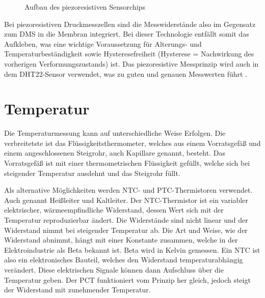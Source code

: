 \begin{figure}[H]
    \caption{Aufbau des piezoresistiven Sensorchips}
    \label{fig:PIEZO}
\end{figure}

Bei piezoresistiven Druckmesszellen sind die Messwiderstände also im Gegensatz zum DMS in die Membran integriert. Bei dieser Technologie entfällt somit das Aufkleben, was eine wichtige Voraussetzung für Alterungs- und Temperaturbeständigkeit sowie Hysteresefreiheit (Hysterese = Nachwirkung des vorherigen Verformungszustands) ist. Das piezoresistive Messprinzip wird auch in dem DHT22-Sensor verwendet, was zu guten und genauen Messwerten führt \cite{Keller:2019}.

\section{Temperatur}

Die Temperaturmessung kann auf unterschiedliche Weise Erfolgen. Die verbreitetste ist das Flüssigkeitsthermometer, welches aus einem Vorratsgefäß und einem angeschlossenen Steigrohr, auch Kapillare genannt, besteht. Das Vorratsgefäß ist mit einer thermometrischen Flüssigkeit gefüllt, welche sich bei steigender Temperatur ausdehnt und das Steigrohr füllt.

Als alternative Möglichkeiten werden NTC- und PTC-Thermistoren verwendet. Auch genannt Heißleiter und Kaltleiter. Der NTC-Thermistor ist ein variabler elektrischer, wärmeempfindliche Widerstand, dessen Wert sich mit der Temperatur reproduzierbar ändert. Die Widerstände sind nicht linear und der Widerstand nimmt bei steigender Temperatur ab. Die Art und Weise, wie der Widerstand abnimmt, hängt mit einer Konstante zusammen, welche in der Elektroindustrie als Beta bekannt ist. Beta wird in Kelvin gemessen. Ein NTC ist also ein elektronisches Bauteil, welches den Widerstand temperaturabhängig verändert. Diese elektrischen Signale können dann Aufschluss über die Temperatur geben. Der PCT funktioniert vom Prinzip her gleich, jedoch steigt der Widerstand mit zunehmender Temperatur.

